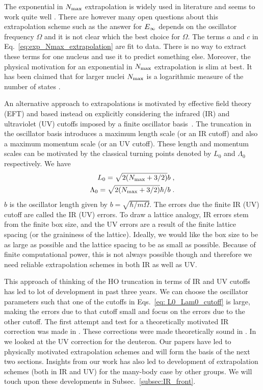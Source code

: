 	The exponential in ${N_{\mathrm{max}}}$ extrapolation is widely used in literature and
	seems to work quite well
	\cite{Hagen:2007hi,Bogner:2007rx,Forssen:2008qp,Maris:2008ax,Roth:2009cw}.
	There are however many open questions about this extrapolation scheme such as
	the answer for $E_{\infty}$ depends on the oscillator frequency $\Omega$ and it is
	not clear which the best choice for $\Omega$.  The terms $a$ and $c$ in
	Eq.~\eqref{eq:exp_Nmax_extrapolation} are fit to data.  There is no way to
	extract these terms for one nucleus and use it to predict something else.
	Moreover, the physical motivation for an exponential in ${N_{\mathrm{max}}}$ extrapolation
	is slim at best.  It has been claimed that for larger nuclei ${N_{\mathrm{max}}}$ is a
	logarithmic measure of the number of states \cite{Bogner:2007rx}.

	An alternative approach to extrapolations is motivated by effective field
	theory (EFT) and based instead on explicitly considering the infrared (IR)
	and ultraviolet (UV) cutoffs imposed by a finite oscillator
	basis~\cite{Coon:2012ab}.  The truncation in the oscillator basis introduces
	a maximum length scale (or an IR cutoff) and also a maximum momentum scale
	(or an UV cutoff).  These length and momentum scales can be motivated by
	the classical turning points denoted by $L_0$ and $\Lambda_0$ respectively.
	We have
	\begin{align}
	L_0 = \sqrt{2 ({N_{\mathrm{max}}} + 3/2)} b \;, \nonumber \\
	\Lambda_0 = \sqrt{2 ({N_{\mathrm{max}}} + 3/2)} \hbar/b \;.
	\label{eq: L0_Lam0_cutoff}
	\end{align}
	$b$ is the oscillator length given by
	$\displaystyle b = \sqrt{\hbar/ m \Omega}$.
	The errors due the finite IR (UV) cutoff are called the IR (UV) errors.
	To draw a lattice analogy, IR errors stem from the finite box size,
	and the UV errors are a result of the finite lattice spacing (or the
	graininess of the lattice).  Ideally, we would like the box size to be as
	large as possible and the lattice spacing to be as small as possible.
	Because of finite computational power, this is not always possible though
	and therefore we need reliable extrapolation schemes in both IR as well as UV.

	This approach of thinking of the HO truncation in terms of IR and UV cutoffs
	has led to lot of development in past three years.
	We can choose the oscillator parameters such that one of the cutoffs in
	Eqs.~\eqref{eq: L0_Lam0_cutoff} is large, making the errors due to that cutoff
	small and focus on the errors due to the other cutoff.
	The first attempt and
	test for a theoretically motivated IR correction was made in
	\cite{Furnstahl2012}.  These corrections were made theoretically sound
	in \cite{More:2013rma, Furnstahl:2013vda}.  In \cite{Konig:2014hma} we looked
	at the UV correction for the deuteron.
	Our papers \cite{More:2013rma, Furnstahl:2013vda, Konig:2014hma} have led to
	physically motivated extrapolation schemes and will form the basis of the next
	two sections.  Insights from our work has also led to development of
	extrapolation schemes (both in IR and UV) for the many-body case by other
	groups.  We will touch upon these developments in
	Subsec.~\ref{subsec:IR_front}.

